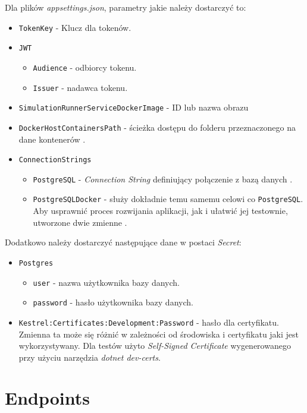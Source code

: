 \par Dla plików \emph{appsettings.json}, parametry jakie należy dostarczyć to:
\begin{itemize}
	\item \texttt{TokenKey} - Klucz dla tokenów.
	\item \texttt{JWT}
	\begin{itemize}
		\item \texttt{Audience} - odbiorcy tokenu.
		\item \texttt{Issuer} - nadawca tokenu.
	\end{itemize}
	\item \texttt{SimulationRunnerServiceDockerImage} - ID lub nazwa obrazu \emph{\docker{}}
	\item \texttt{DockerHostContainersPath} - ścieżka dostępu do folderu przeznaczonego na dane kontenerów .
	\item \texttt{ConnectionStrings}
	\begin{itemize}
		\item \texttt{PostgreSQL} - \emph{Connection String} definiujący połączenie z bazą danych .
		\item \texttt{PostgreSQLDocker} - służy dokładnie temu samemu celowi co \texttt{PostgreSQL}. Aby usprawnić proces rozwijania aplikacji, jak i ułatwić jej testownie, utworzone dwie zmienne .
	\end{itemize}
\end{itemize}

\par Dodatkowo należy dostarczyć następujące dane w postaci \emph{\dotnet{} Secret}:
\begin{itemize}
	\item \texttt{Postgres}
	\begin{itemize}
		\item \texttt{user} - nazwa użytkownika bazy danych.
		\item \texttt{password} - hasło użytkownika bazy danych.
	\end{itemize}
	\item \texttt{Kestrel:Certificates:Development:Password} - hasło dla certyfikatu. Zmienna ta może się różnić w zależności od środowiska i certyfikatu jaki jest wykorzystywany. Dla testów użyto \emph{Self-Signed Certificate} wygenerowanego przy użyciu narzędzia \emph{dotnet dev-certs}.
\end{itemize}

\section{Endpoints}

